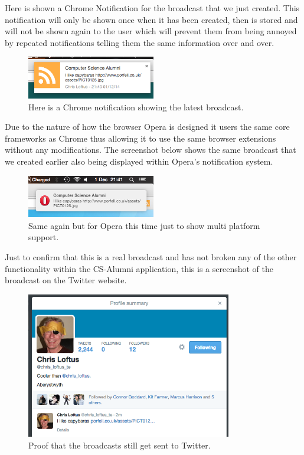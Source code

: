 \documentclass{article}
\begin{document}
Here is shown a Chrome Notification for the broadcast that we just created. This notification will only be shown once when it has been created, then is stored and will not be shown again to the user which will prevent them from being annoyed by repeated notifications telling them the same information over and over.

\begin{figure}[H]
\centering
\includegraphics[width=0.5\textwidth]{chromenotification}
\caption{Here is a Chrome notification showing the latest broadcast.}
\end{figure}

Due to the nature of how the browser Opera is designed it users the same core frameworks as Chrome thus allowing it to use the same browser extensions without any modifications. The screenshot below shows the same broadcast that we created earlier also being displayed within Opera's notification system.

\begin{figure}[H]
\centering
\includegraphics[width=0.5\textwidth]{operanotification}
\caption{Same again but for Opera this time just to show multi platform support.}
\end{figure}

\newpage
Just to confirm that this is a real broadcast and has not broken any of the other functionality within the CS-Alumni application, this is a screenshot of the broadcast on the Twitter website.

\begin{figure}[H]
\centering
\includegraphics[width=0.8\textwidth]{twitterbc}
\caption{Proof that the broadcasts still get sent to Twitter.}
\end{figure}
\end{document}
